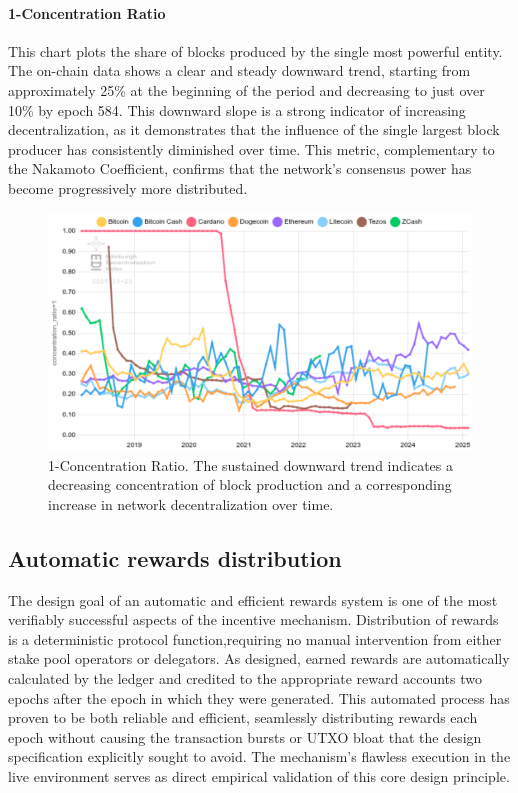 \documentclass[11pt, letterpaper]{article}
\begin{document}
\paragraph{1-Concentration Ratio} This chart plots the share of blocks produced by the single
most powerful entity. The on-chain data shows a clear and steady downward trend, starting from
approximately 25\% at the beginning of the period and decreasing to just over 10\% by epoch 584.
This downward slope is a strong indicator of increasing decentralization, as it demonstrates that
the influence of the single largest block producer has consistently diminished over time. This metric,
complementary to the Nakamoto Coefficient, confirms that the network's consensus power
has become progressively more distributed.

\begin{figure}[H]
	\centering
	\includegraphics[width=\textwidth]{img/consensus-concentration_ratio=1-chart.png}
	\caption{1-Concentration Ratio. The sustained downward trend indicates a decreasing concentration
		of block production and a corresponding increase in network decentralization over time.}
	\label{fig:k_effective}
\end{figure}

\subsection{Automatic rewards distribution}

The design goal of an automatic and efficient rewards system is one of the most
verifiably successful aspects of the incentive mechanism. Distribution of rewards
is a deterministic protocol function,requiring no manual intervention from either stake pool
operators or delegators. As designed, earned rewards are automatically calculated by the
ledger and credited to the appropriate reward accounts two epochs after the
epoch in which they were generated. This automated process has proven to be
both reliable and efficient, seamlessly distributing rewards each epoch without
causing the transaction bursts or UTXO bloat that the design specification
explicitly sought to avoid. The mechanism's flawless execution in the live
environment serves as direct empirical validation of this core design
principle.
\end{document}
